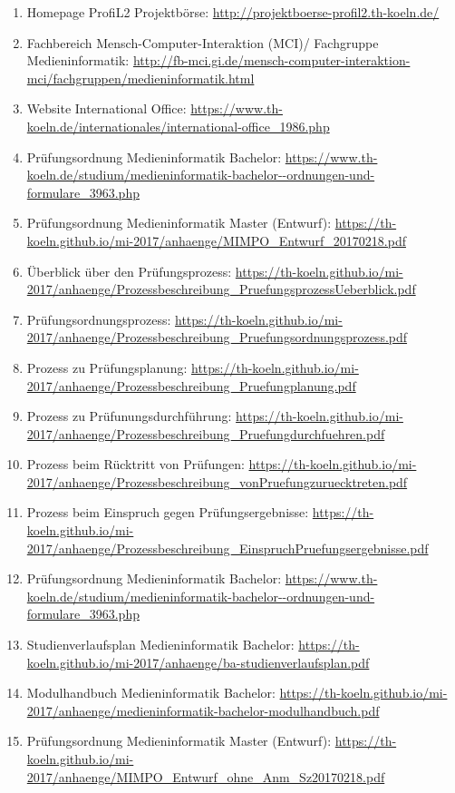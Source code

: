 \documentclass[BCOR12mm,DIV11,titlepage,a4paper,oneside,10pt]{scrbook}
\begin{document}
\begin{sloppypar}
\begin{flushleft}
\begin{enumerate}
\item{Homepage ProfiL2 Projektbörse: \url{http://projektboerse-profil2.th-koeln.de/} } 
\item{Fachbereich Mensch-Computer-Interaktion (MCI)/ Fachgruppe Medieninformatik: \url{http://fb-mci.gi.de/mensch-computer-interaktion-mci/fachgruppen/medieninformatik.html} } 
\item{Website International Office: \url{https://www.th-koeln.de/internationales/international-office\_1986.php} } 
\item{Prüfungsordnung Medieninformatik Bachelor: \url{https://www.th-koeln.de/studium/medieninformatik-bachelor--ordnungen-und-formulare\_3963.php} } 
\item{Prüfungsordnung Medieninformatik Master (Entwurf): \url{https://th-koeln.github.io/mi-2017/anhaenge/MIMPO\_Entwurf\_20170218.pdf} } 
\item{Überblick über den Prüfungsprozess: \url{https://th-koeln.github.io/mi-2017/anhaenge/Prozessbeschreibung\_PruefungsprozessUeberblick.pdf} } 
\item{Prüfungsordnungsprozess: \url{https://th-koeln.github.io/mi-2017/anhaenge/Prozessbeschreibung\_Pruefungsordnungsprozess.pdf} } 
\item{Prozess zu Prüfungsplanung: \url{https://th-koeln.github.io/mi-2017/anhaenge/Prozessbeschreibung\_Pruefungplanung.pdf} } 
\item{Prozess zu Prüfunungsdurchführung: \url{https://th-koeln.github.io/mi-2017/anhaenge/Prozessbeschreibung\_Pruefungdurchfuehren.pdf} } 
\item{Prozess beim Rücktritt von Prüfungen: \url{https://th-koeln.github.io/mi-2017/anhaenge/Prozessbeschreibung\_vonPruefungzuruecktreten.pdf} } 
\item{Prozess beim Einspruch gegen Prüfungsergebnisse: \url{https://th-koeln.github.io/mi-2017/anhaenge/Prozessbeschreibung\_EinspruchPruefungsergebnisse.pdf} } 
\item{Prüfungsordnung Medieninformatik Bachelor: \url{https://www.th-koeln.de/studium/medieninformatik-bachelor--ordnungen-und-formulare\_3963.php} } 
\item{Studienverlaufsplan Medieninformatik Bachelor: \url{https://th-koeln.github.io/mi-2017/anhaenge/ba-studienverlaufsplan.pdf} } 
\item{Modulhandbuch Medieninformatik Bachelor: \url{https://th-koeln.github.io/mi-2017/anhaenge/medieninformatik-bachelor-modulhandbuch.pdf} } 
\item{Prüfungsordnung Medieninformatik Master (Entwurf): \url{https://th-koeln.github.io/mi-2017/anhaenge/MIMPO\_Entwurf\_ohne\_Anm\_Sz20170218.pdf} } 

\end{enumerate}
\end{flushleft}
\end{sloppypar}
\end{document}
